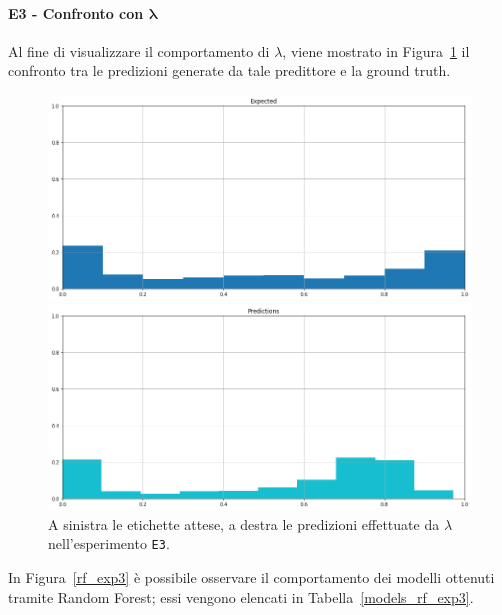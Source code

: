 \documentclass[12pt]{report}
\theoremstyle{definition}
\begin{document}
\paragraph{E3 - Confronto con $\bm{\lambda}$}
Al fine di visualizzare il comportamento di $\lambda$, viene mostrato in Figura~\ref{prediction_exp3} il confronto tra le predizioni generate da tale predittore e la ground truth.
\begin{figure}
\centering
    \begin{minipage}{0.48\textwidth}
        \includegraphics[width=\linewidth]{images/experiment_beta05_disgiunti/expected_memberships.png}
    \end{minipage}
    \begin{minipage}{0.48\textwidth}
        \includegraphics[width=\linewidth]{images/experiment_beta05_disgiunti/prediction_memberships.png}
    \end{minipage}
    \caption{A sinistra le etichette attese, a destra le predizioni effettuate da $\lambda$ nell'esperimento \texttt{E3}.}
    \label{prediction_exp3}
\end{figure} 

In Figura~\ref{rf_exp3} è possibile osservare il comportamento dei modelli ottenuti tramite Random Forest; essi vengono elencati in Tabella~\ref{models_rf_exp3}.
\end{document}
